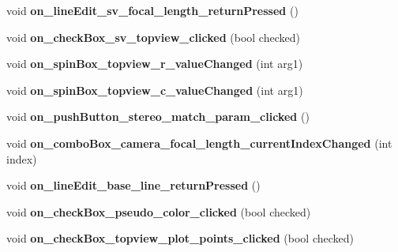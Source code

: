 \begin{DoxyCompactItemize}
\item 
\hypertarget{class_main_window_ad21b3bf3184684c58f48c50e2818e2d2}{}void {\bfseries on\+\_\+line\+Edit\+\_\+sv\+\_\+focal\+\_\+length\+\_\+return\+Pressed} ()\label{class_main_window_ad21b3bf3184684c58f48c50e2818e2d2}

\item 
\hypertarget{class_main_window_aa06fa5822c8b49551444306d38eb7581}{}void {\bfseries on\+\_\+check\+Box\+\_\+sv\+\_\+topview\+\_\+clicked} (bool checked)\label{class_main_window_aa06fa5822c8b49551444306d38eb7581}

\item 
\hypertarget{class_main_window_aa6f408ff31e7af45608a2e8d2e1ff420}{}void {\bfseries on\+\_\+spin\+Box\+\_\+topview\+\_\+r\+\_\+value\+Changed} (int arg1)\label{class_main_window_aa6f408ff31e7af45608a2e8d2e1ff420}

\item 
\hypertarget{class_main_window_a192351847dee86607cb895e960b73abf}{}void {\bfseries on\+\_\+spin\+Box\+\_\+topview\+\_\+c\+\_\+value\+Changed} (int arg1)\label{class_main_window_a192351847dee86607cb895e960b73abf}

\item 
\hypertarget{class_main_window_a3231412e9991f9e2983b8dbbf1eb12a0}{}void {\bfseries on\+\_\+push\+Button\+\_\+stereo\+\_\+match\+\_\+param\+\_\+clicked} ()\label{class_main_window_a3231412e9991f9e2983b8dbbf1eb12a0}

\item 
\hypertarget{class_main_window_a22b957f8849f75f4b8bbc5258395c874}{}void {\bfseries on\+\_\+combo\+Box\+\_\+camera\+\_\+focal\+\_\+length\+\_\+current\+Index\+Changed} (int index)\label{class_main_window_a22b957f8849f75f4b8bbc5258395c874}

\item 
\hypertarget{class_main_window_a49115ba3b5ec385e73ceeebc8091e909}{}void {\bfseries on\+\_\+line\+Edit\+\_\+base\+\_\+line\+\_\+return\+Pressed} ()\label{class_main_window_a49115ba3b5ec385e73ceeebc8091e909}

\item 
\hypertarget{class_main_window_a00b2cebc1a81b57870c2c61b53781d77}{}void {\bfseries on\+\_\+check\+Box\+\_\+pseudo\+\_\+color\+\_\+clicked} (bool checked)\label{class_main_window_a00b2cebc1a81b57870c2c61b53781d77}

\item 
\hypertarget{class_main_window_af81c40636f6d1d6003ab6f7b93040269}{}void {\bfseries on\+\_\+check\+Box\+\_\+topview\+\_\+plot\+\_\+points\+\_\+clicked} (bool checked)\label{class_main_window_af81c40636f6d1d6003ab6f7b93040269}


\end{DoxyCompactItemize}
